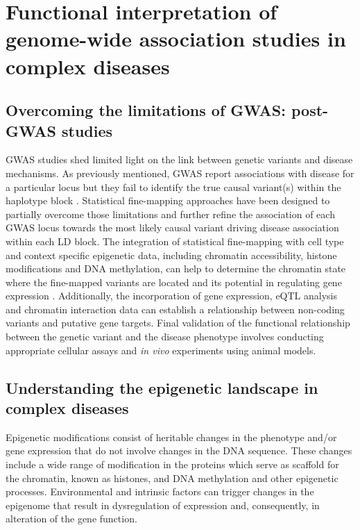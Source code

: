 \section{Functional interpretation of genome-wide association studies in complex diseases}

\subsection{Overcoming the limitations of GWAS: post-GWAS studies}
GWAS studies shed limited light on the link between genetic variants and disease mechanisms. As previously mentioned, GWAS report associations with disease for a particular locus but they fail to identify the true causal variant(s) within the haplotype block \parencite{Edwards2013}. Statistical fine-mapping approaches have been designed to partially overcome those limitations and further refine the association of each GWAS locus towards the most likely causal variant driving disease association within each LD block. The integration of statistical fine-mapping with cell type and context specific epigenetic data, including chromatin accessibility, histone modifications and DNA methylation, can help to determine the chromatin state where the fine-mapped variants are located and its potential in regulating gene expression \parencite{Petronis2010}. Additionally, the incorporation of gene expression, eQTL analysis and chromatin interaction data can establish a relationship between non-coding variants and putative gene targets. Final validation of the functional relationship between the genetic variant and the disease phenotype involves conducting appropriate cellular assays and \textit{in vivo} experiments using animal models.



\subsection{Understanding the epigenetic landscape in complex diseases}
\label{subsec:Epigenetics}

Epigenetic modifications consist of heritable changes in the phenotype and/or gene expression that do not involve changes in the DNA sequence\parencite{Feil2012}. These changes include a wide range of modification in the proteins which serve as scaffold for the chromatin, known as histones, and DNA methylation and other epigenetic processes. Environmental and intrinsic factors can trigger changes in the epigenome that result in dysregulation of expression and, consequently, in alteration of the gene function.

